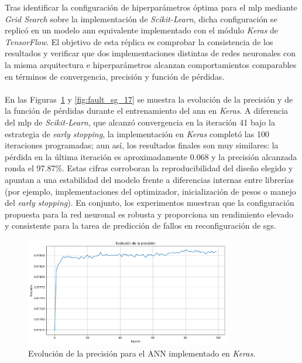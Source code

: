Tras identificar la configuración de hiperparámetros óptima para el \gls{mlp} mediante \textit{Grid Search} sobre la implementación de \textit{Scikit-Learn}, dicha configuración se replicó en un modelo \gls{ann} equivalente implementado con el módulo \textit{Keras} de \textit{TensorFlow}. El objetivo de esta réplica es comprobar la consistencia de los resultados y verificar que dos implementaciones distintas de redes neuronales con la misma arquitectura e hiperparámetros alcanzan comportamientos comparables en términos de convergencia, precisión y función de pérdidas.\\
\\
En las Figuras~\ref{fig:fault_sg_16} y \ref{fig:fault_sg_17} se muestra la evolución de la precisión y de la función de pérdidas durante el entrenamiento del \gls{ann} en \textit{Keras}. A diferencia del \gls{mlp} de \textit{Scikit-Learn}, que alcanzó convergencia en la iteración 41 bajo la estrategia de \textit{early stopping}, la implementación en \textit{Keras} completó las 100 iteraciones programadas; aun así, los resultados finales son muy similares: la pérdida en la última iteración es aproximadamente 0.068 y la precisión alcanzada ronda el 97.87\%. Estas cifras corroboran la reproducibilidad del diseño elegido y apuntan a una estabilidad del modelo frente a diferencias internas entre librerías (por ejemplo, implementaciones del optimizador, inicialización de pesos o manejo del \textit{early stopping}). En conjunto, los experimentos muestran que la configuración propuesta para la red neuronal es robusta y proporciona un rendimiento elevado y consistente para la tarea de predicción de fallos en reconfiguración de \glspl{sg}.

\begin{figure}[H]
\centering
\includegraphics[width=0.8\textwidth]{fig/06_fault_sg/fault_sg_16.png}
\caption{Evolución de la precisión para el ANN implementado en \textit{Keras}.}
\label{fig:fault_sg_16}
\end{figure}

